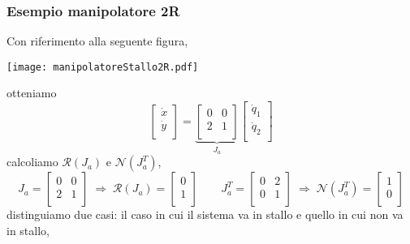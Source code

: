 \subsubsection{Esempio manipolatore 2R}
Con riferimento alla seguente figura,
\begin{center}
	\texttt{[image: manipolatoreStallo2R.pdf]}
\end{center}
otteniamo
\begin{equation}
	\begin{bmatrix}
		\dot{x} \\
		\dot{y} \\
	\end{bmatrix}
	= 
	\underbrace{
	\begin{bmatrix}
		0 & 0 \\
		2 & 1 \\
	\end{bmatrix}
	}_{J_a}
	\begin{bmatrix}
		\dot{q}_1 \\
		\dot{q}_2 \\
	\end{bmatrix}
\end{equation}
calcoliamo $\mathcal{R}(J_a)$ e $\mathcal{N}(J_a^T)$,
\begin{equation}
	J_a = 
	\begin{bmatrix}
		0 & 0 \\
		2 & 1 \\
	\end{bmatrix}
	\; \Rightarrow \; \mathcal{R}(J_a) = 
	\begin{bmatrix}
		0 \\
		1 \\
	\end{bmatrix}
	\qquad 
	J_a^T = 
	\begin{bmatrix}
		0 & 2 \\
		0 & 1 \\
	\end{bmatrix}
	\; \Rightarrow \; \mathcal{N}(J_a^T) = 
	\begin{bmatrix}
		1 \\
		0 \\
	\end{bmatrix}
\end{equation}
distinguiamo due casi: il caso in cui il sistema va in stallo e quello in cui non va in stallo,
